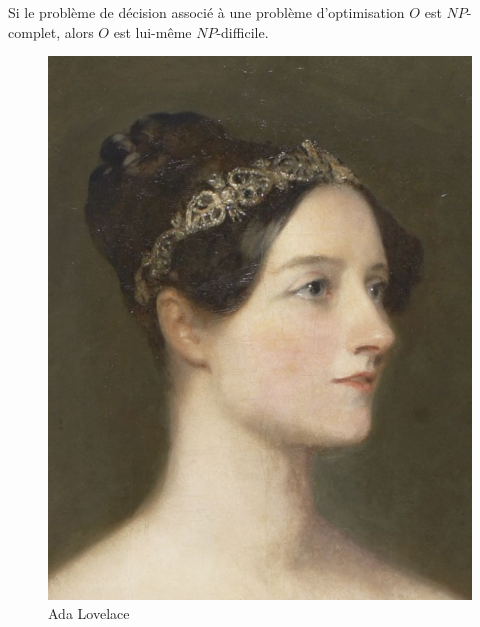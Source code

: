 \documentclass[a4paper,11pt,twocolumn]{article}
\begin{document}
		\begin{defn}
		Si le problème de décision associé à une problème d'optimisation $O$ est $NP$-complet, alors $O$ est lui-même $NP$-difficile.
		\end{defn}
		
		\vspace{3cm}
		\begin{figure}[htp]
		\centering
		\includegraphics[scale=0.90]{Ada-Lovelace.png}
		\caption{Ada Lovelace}
		\label{}
		\end{figure}
\end{document}
